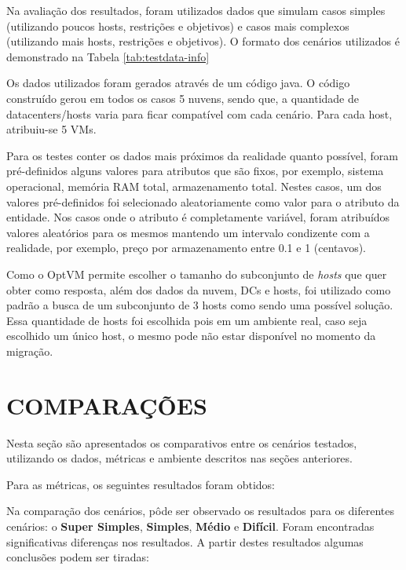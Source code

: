 Na avaliação dos resultados, foram utilizados dados que simulam casos simples (utilizando poucos
hosts, restrições e objetivos) e casos mais complexos (utilizando mais hosts, restrições e objetivos). 
O formato dos cenários utilizados é demonstrado na Tabela \ref{tab:testdata-info}



Os dados utilizados foram gerados através de um código java. O código
construído gerou em todos os casos 5 nuvens, sendo que, a quantidade de
datacenters/hosts varia para ficar compatível com cada cenário. Para cada
host, atribuiu-se 5 VMs.

Para os testes conter os dados mais próximos da realidade quanto possível,
foram pré-definidos alguns valores para atributos que são fixos, por exemplo,
sistema operacional, memória RAM total, armazenamento total. Nestes casos, um dos valores
pré-definidos foi selecionado aleatoriamente como valor para o atributo da entidade. 
Nos casos onde o atributo é completamente variável, foram atribuídos valores aleatórios para os 
mesmos mantendo um intervalo condizente com a realidade, por exemplo, preço por armazenamento
entre 0.1 e 1 (centavos).

Como o OptVM permite escolher o tamanho do subconjunto de \textit{hosts} que quer obter como resposta,
além dos dados da nuvem, DCs e hosts, foi utilizado como padrão a busca de um subconjunto de
3 hosts como sendo uma possível solução. Essa quantidade de hosts foi escolhida pois em um ambiente 
real, caso seja escolhido um único host, o mesmo pode não estar disponível no momento da migração.

\section{COMPARAÇÕES}

Nesta seção são apresentados os comparativos entre os cenários testados, utilizando os dados, 
métricas e ambiente descritos nas seções anteriores. 

Para as métricas, os seguintes resultados foram obtidos:



Na comparação dos cenários, pôde ser observado os resultados para os diferentes cenários:
o \textbf{Super Simples}, \textbf{Simples}, \textbf{Médio} e \textbf{Difícil}. 
Foram encontradas significativas diferenças nos resultados. A partir destes resultados 
algumas conclusões podem ser tiradas:

